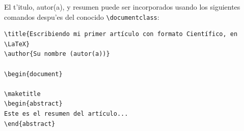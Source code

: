 \documentclass[11pt]{exam}
\begin{document}
\begin{questions}
El t'itulo, autor(a), y resumen puede ser incorporados usando los siguientes comandos despu'es del conocido \verb|\documentclass|:

\begin{verbatim}
\title{Escribiendo mi primer artículo con formato Científico, en \LaTeX}
\author{Su nombre (autor(a))}

\begin{document}

\maketitle
\begin{abstract}
Este es el resumen del artículo...
\end{abstract}
\end{verbatim}
\end{questions}
\end{document}
